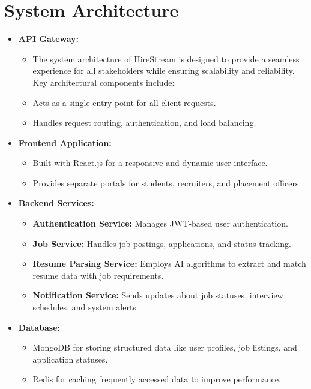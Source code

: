 \documentclass[a4paper, 12pt]{report}
\begin{document}
\section{\textbf{System Architecture}}
\begin{itemize}[itemsep=-4pt]
    \item \textbf{API Gateway:}
    \begin{itemize}[label=$\circ$]
    \item The system architecture of HireStream is designed to provide a seamless experience for all stakeholders while ensuring scalability and reliability. Key architectural components include:
    \item Acts as a single entry point for all client requests.
    \item Handles request routing, authentication, and load balancing.
\end{itemize}

    \item \textbf{Frontend Application:}
    \begin{itemize}[itemsep=-4pt,label=$\circ$]
    \item Built with React.js for a responsive and dynamic user interface.
    \item Provides separate portals for students, recruiters, and placement officers.
    
\end{itemize}
    
    \item \textbf{Backend Services:}
    \begin{itemize}[itemsep=-4pt,label=$\circ$]
    \item \textbf{Authentication Service:} Manages JWT-based user authentication.
    \item \textbf{Job Service:} Handles job postings, applications, and status tracking.
    \item \textbf{Resume Parsing Service:} Employs AI algorithms to extract and match resume data with job requirements.
    \item \textbf{Notification Service:} Sends updates about job statuses, interview schedules, and system alerts .
\end{itemize}
    \item \textbf{Database:}
     \begin{itemize}[itemsep=-4pt,label=$\circ$]
    \item MongoDB for storing structured data like user profiles, job listings, and application statuses.
    \item Redis for caching frequently accessed data to improve performance.
    
\end{itemize} 
\pagebreak
    
\end{itemize}
\end{document}
